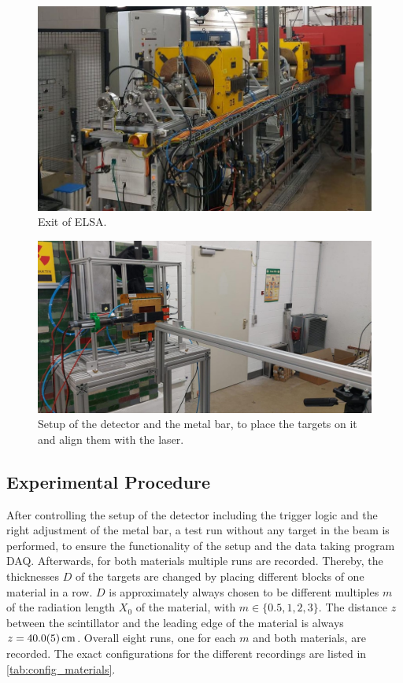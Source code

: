\documentclass[sn-mathphys-num,iicol]{sn-jnl}
\theoremstyle{thmstyleone}
\theoremstyle{thmstyletwo}
\theoremstyle{thmstylethree}
\begin{document}
\begin{figure}
  \includegraphics[width=\linewidth]{figures/beam_setup_elsa.jpg}
  \caption{Exit of ELSA.}
  \label{fig:beam_setup_elsa}
\end{figure}

\begin{figure}
  \includegraphics[width=\linewidth]{figures/detector_setup_elsa.jpg}
  \caption{Setup of the detector and the metal bar, to place the targets on it and align them with the laser.}
  \label{fig:detector_setup_elsa}
\end{figure}

\subsection{Experimental Procedure}
After controlling the setup of the detector including the trigger logic and the right adjustment of the metal bar, a test run without any target in the beam is performed, to ensure the functionality of the setup and the data taking program DAQ.
Afterwards, for both materials multiple runs are recorded. Thereby, the thicknesses $D$ of the targets are changed by placing different blocks of one material in a row. $D$ is approximately always chosen to be different multiples $m$ of the radiation length $X_0$ of the material, with $m\in\{0.5,1,2,3\}$. The distance $z$ between the scintillator and the leading edge of the material is always $z=\SI{40\pm0.5}{cm}$. Overall eight runs, one for each $m$ and both materials, are recorded. The exact configurations for the different recordings are listed in \autoref{tab:config_materials}.
\end{document}
